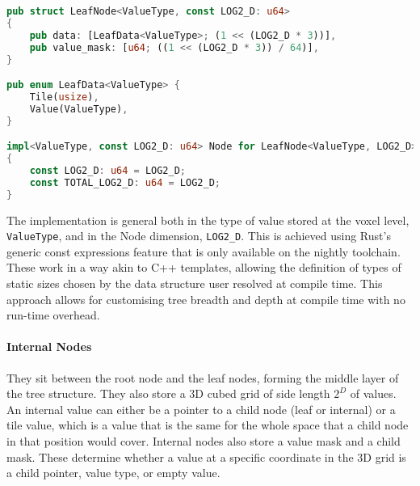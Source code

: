 \begin{lstlisting}[language=rust, captionpos=b, caption={
    \texttt{LeafNode} definition.
    In the original paper\supercite{vdb2013}, node data is set as a union instead of an enum in order to save on memory space, only using the masks to determine the type of a particular value.
    In this implementation, an enum is used strictly for \emph{ergonomics}, as the extra 1 byte of memory per value is generally not expensive on heap-allocated memory.
    The value mask will still be crucial for the GPU version of VDB, where effective memory management is more important, and shading languages do not have enum support.
    In the \texttt{Node} trait implementation, since these nodes are the bottom level in the hierarchy (meaning they have no children), their in-memory dimensions are the same as their world space dimensions.
  }, label={code:leaf}]
pub struct LeafNode<ValueType, const LOG2_D: u64>
{
    pub data: [LeafData<ValueType>; (1 << (LOG2_D * 3))],
    pub value_mask: [u64; ((1 << (LOG2_D * 3)) / 64)],
}

pub enum LeafData<ValueType> {
    Tile(usize),
    Value(ValueType),
}

impl<ValueType, const LOG2_D: u64> Node for LeafNode<ValueType, LOG2_D>
{
    const LOG2_D: u64 = LOG2_D;
    const TOTAL_LOG2_D: u64 = LOG2_D;
}
\end{lstlisting}

The implementation is general both in the type of value stored at the voxel level, \verb|ValueType|, and in the Node dimension, \verb|LOG2_D|. This is achieved using Rust's generic const expressions feature \supercite{rust:generic} that is only available on the nightly toolchain. These work in a way akin to C++ templates, allowing the definition of types of static sizes chosen by the data structure user resolved at compile time. This approach allows for customising tree breadth and depth at compile time with no run-time overhead.

\paragraph{Internal Nodes} They sit between the root node and the leaf nodes, forming the middle layer of the tree structure.
They also store a 3D cubed grid of side length $2^{D}$ of values. An internal value can either be a pointer to a child node (leaf or internal) or a tile value, which is a value that is the same for the whole space that a child node in that position would cover.
Internal nodes also store a value mask and a child mask. These determine whether a value at a specific coordinate in the 3D grid is a child pointer, value type, or empty value.


